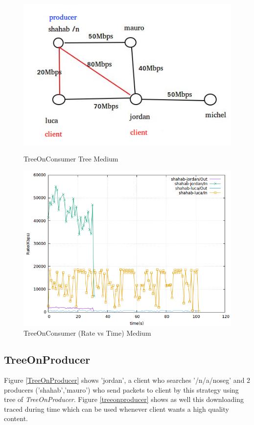\begin{figure}[H]

\begin{center}

\includegraphics[scale = 0.4]{Figures/TreeOnConsumer.png}

\caption{TreeOnConsumer Tree Medium} \label{TreeOnConsumer} 


\includegraphics[scale = 0.4]{Figures/treeonconsumer.png}

\caption{TreeOnConsumer (Rate vs Time) Medium} \label{treeonconsumer} 


\end{center}

\end{figure}


\subsection{TreeOnProducer}
Figure \ref{TreeOnProducer} shows 'jordan', a client who searches '/n/a/noseg' and 2 producers ('shahab','mauro') who send packets to client by this strategy using tree of \textit{TreeOnProducer}. 
Figure \ref{treeonproducer} shows as well this downloading traced during time which can be used whenever client wants a high quality content.

